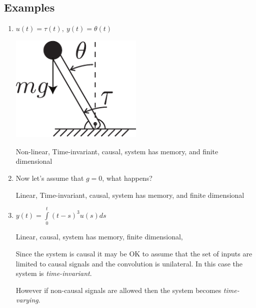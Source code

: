 \documentclass[12pt,oneside]{amsart}
\begin{document}
\newpage

\subsection{Examples}

\vspace{12pt}

\begin{enumerate}

  \item $u(t) = \tau(t) , \ y(t) = \theta(t)$

\vspace{12pt}

  \begin{minipage}[h]{0.5\linewidth}
    \begin{center}
      \includegraphics[width=0.5\textwidth]{pendulum}
    \end{center}
  \end{minipage}

\vspace{12pt}

Non-linear, Time-invariant, causal, system has memory, and finite dimensional

\vspace{12pt}

\item Now let's assume that $g = 0$, what happens?

\vspace{12pt}

Linear, Time-invariant, causal, system has memory, and finite dimensional

\vspace{12pt}

\item $y(t) = \int\limits_{0}^{t} (t-s)^3 u(s) ds$

\vspace{12pt}

Linear, causal, system has memory, finite dimensional,

Since the system is causal it may be OK to assume that the set of
inputs are limited to causal signals and the convolution is unilateral.
In this case the system is \textit{time-invariant}.

\vspace{6pt}

However if non-causal signals are allowed then the system becomes
\textit{time-varying}. 

\end{enumerate}
\end{document}
